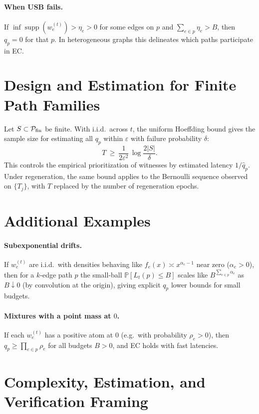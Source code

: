\documentclass[11pt]{article}
\theoremstyle{plain}
\theoremstyle{definition}
\newcommand{\Prb}{\mathbb{P}}
\begin{document}
\paragraph{When USB fails.}
If $\inf\operatorname{supp}(w_e^{(t)})>\eta_e>0$ for some edges on $p$ and $\sum_{e\in p}\eta_e>B$, then $q_p=0$ for that $p$. In heterogeneous graphs this delineates which paths participate in EC.

\section{Design and Estimation for Finite Path Families}
Let $S\subset\mathcal{P}_{\rm fin}$ be finite. With i.i.d.\ across $t$, the uniform Hoeffding bound gives the sample size for estimating all $q_p$ within $\varepsilon$ with failure probability $\delta$:
\[
T\ \ge\ \frac{1}{2\varepsilon^2}\,\log\frac{2|S|}{\delta}.
\]
This controls the empirical prioritization of witnesses by estimated latency $1/\hat q_p$. Under regeneration, the same bound applies to the Bernoulli sequence observed on $\{T_j\}$, with $T$ replaced by the number of regeneration epochs.

\section{Additional Examples}
\paragraph{Subexponential drifts.}
If $w_e^{(t)}$ are i.i.d.\ with densities behaving like $f_e(x)\asymp x^{\alpha_e-1}$ near zero ($\alpha_e>0$), then for a $k$‑edge path $p$ the small‑ball $\Prb[L_t(p)\le B]$ scales like $B^{\sum_{e\in p}\alpha_e}$ as $B\downarrow 0$ (by convolution at the origin), giving explicit $q_p$ lower bounds for small budgets.

\paragraph{Mixtures with a point mass at $0$.}
If each $w_e^{(t)}$ has a positive atom at $0$ (e.g.\ with probability $\rho_e>0$), then $q_p\ge \prod_{e\in p}\rho_e$ for all budgets $B>0$, and EC holds with fast latencies.

\section{Complexity, Estimation, and Verification Framing}
\end{document}
